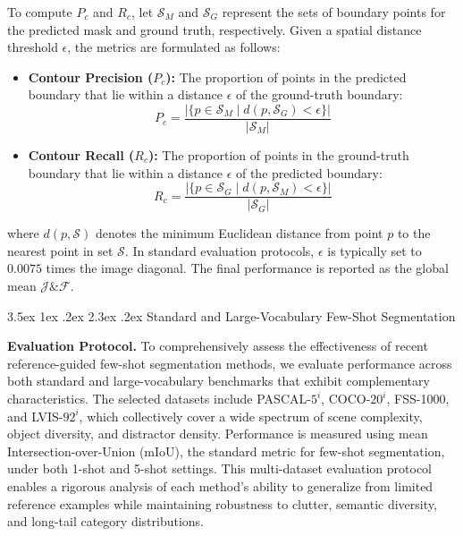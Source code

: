 \documentclass[journal,12pt,onecolumn,draftclsnofoot]{IEEEtran}
\makeatletter
\renewcommand{\section}{\@startsection{section}{1}{\z@}%
    {3.5ex \@plus 1ex \@minus .2ex}%
    {2.3ex \@plus.2ex}%
    {\normalfont\Large\bfseries}}
\makeatother
\begin{document}
To compute $P_c$ and $R_c$, let $\mathcal{S}_M$ and $\mathcal{S}_G$ represent the sets of boundary points for the predicted mask and ground truth, respectively. Given a spatial distance threshold $\epsilon$, the metrics are formulated as follows:
\begin{itemize}
    \item \textbf{Contour Precision ($P_c$):} The proportion of points in the predicted boundary that lie within a distance $\epsilon$ of the ground-truth boundary:
    \begin{equation}
        P_c = \frac{|\{p \in \mathcal{S}_M \mid d(p, \mathcal{S}_G) < \epsilon\}|}{|\mathcal{S}_M|}
    \end{equation}
    
    \item \textbf{Contour Recall ($R_c$):} The proportion of points in the ground-truth boundary that lie within a distance $\epsilon$ of the predicted boundary:
    \begin{equation}
        R_c = \frac{|\{p \in \mathcal{S}_G \mid d(p, \mathcal{S}_M) < \epsilon\}|}{|\mathcal{S}_G|}
    \end{equation}
\end{itemize}
where $d(p, \mathcal{S})$ denotes the minimum Euclidean distance from point $p$ to the nearest point in set $\mathcal{S}$. In standard evaluation protocols, $\epsilon$ is typically set to $0.0075$ times the image diagonal. The final performance is reported as the global mean $\mathcal{J}\&\mathcal{F}$.

\section{Standard and Large-Vocabulary Few-Shot Segmentation}

\noindent\textbf{Evaluation Protocol.}
To comprehensively assess the effectiveness of recent reference-guided few-shot segmentation methods, we evaluate performance across both standard and large-vocabulary benchmarks that exhibit complementary characteristics. The selected datasets include PASCAL-$5^i$, COCO-$20^i$, FSS-1000, and LVIS-$92^i$, which collectively cover a wide spectrum of scene complexity, object diversity, and distractor density. Performance is measured using mean Intersection-over-Union (mIoU), the standard metric for few-shot segmentation, under both 1-shot and 5-shot settings. This multi-dataset evaluation protocol enables a rigorous analysis of each method’s ability to generalize from limited reference examples while maintaining robustness to clutter, semantic diversity, and long-tail category distributions. 
\end{document}
